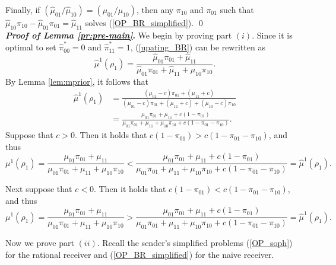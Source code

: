 \documentclass[12pt,english]{article}
\theoremstyle{plain}
\begin{document}
\begin{appendices}
Finally, if $(\hat{\mu}_{01}/\hat{\mu}_{10})=(\mu_{01}/\mu_{10})$, then any $\pi_{10}$ and $\pi_{01}$ such that $\hat{\mu}_{10}\pi_{10}-\hat{\mu}_{01}\pi_{01}=\hat{\mu}_{11}$
solves (\ref{OP_BR_simplified}). \qed\\

\noindent\textbf{\emph{Proof of Lemma \ref{pr:pre-main}}.}
We begin by proving part $(i)$. 
Since it is optimal to set $\hat\pi^*_{00}=0$ and $\hat\pi^*_{11}=1$, (\ref{upating_BR}) can be rewritten as
\[
\hat{\mu}^{1}\left(\rho_{1}\right)=\frac{\hat{\mu}_{01}\pi_{01}+\hat{\mu}_{11}}{\hat{\mu}_{01}\pi_{01}+\hat{\mu}_{11}+\hat{\mu}_{10}\pi_{10}}.
\]
By Lemma \ref{lem:mprior}, it follows that
\[
\begin{aligned}
\hat{\mu}^{1}\left(\rho_{1}\right) &=\frac{\left(\mu_{01}-c\right)\pi_{01}+\left(\mu_{11}+c\right)}{\left(\mu_{01}-c\right)\pi_{01}+\left(\mu_{11}+c\right)+\left(\mu_{10}-c\right)\pi_{10}}\\
&=\frac{\mu_{01}\pi_{01}+\mu_{11}+c\left(1-\pi_{01}\right)}{\mu_{01}\pi_{01}+\mu_{11}+\mu_{10}\pi_{10}+c\left(1-\pi_{01}-\pi_{10}\right)}.
\end{aligned}
\]
Suppose that $c>0$.
Then it holds that $c\left(1-\pi_{01}\right)>c\left(1-\pi_{01}-\pi_{10}\right)$,
and thus 
\[
\mu^{1}\left(\rho_{1}\right)=\frac{\mu_{01}\pi_{01}+\mu_{11}}{\mu_{01}\pi_{01}+\mu_{11}+\mu_{10}\pi_{10}}<\frac{\mu_{01}\pi_{01}+\mu_{11}+c\left(1-\pi_{01}\right)}{\mu_{01}\pi_{01}+\mu_{11}+\mu_{10}\pi_{10}+c\left(1-\pi_{01}-\pi_{10}\right)}=\hat{\mu}^{1}\left(\rho_{1}\right).
\]

Next suppose that $c<0$.
Then it holds that $c\left(1-\pi_{01}\right)<c\left(1-\pi_{01}-\pi_{10}\right)$,
and thus
\[
\mu^{1}\left(\rho_{1}\right)=\frac{\mu_{01}\pi_{01}+\mu_{11}}{\mu_{01}\pi_{01}+\mu_{11}+\mu_{10}\pi_{10}}>\frac{\mu_{01}\pi_{01}+\mu_{11}+c\left(1-\pi_{01}\right)}{\mu_{01}\pi_{01}+\mu_{11}+\mu_{10}\pi_{10}+c\left(1-\pi_{01}-\pi_{10}\right)}=\hat{\mu}^{1}\left(\rho_{1}\right).
\]

Now we prove part $(ii)$. 
Recall the sender's simplified problems (\ref{OP_soph}) for the rational receiver and (\ref{OP_BR_simplified}) for the naive receiver. 

\end{appendices}
\end{document}
